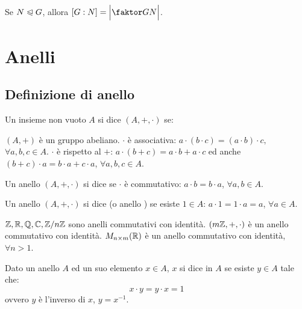 \documentclass[11pt]{scrartcl}
\begin{document}
\begin{remark}
Se $N \trianglelefteqslant G$, allora $[G:N]=\Big|\faktor GN\Big|$.
\end{remark}




\newpage
\section{Anelli}
\subsection{Definizione di anello}
\begin{definition}
Un insieme non vuoto $A$ si dice  $(A,+,\cdot)$ se:
	\begin{itemize}
	\ii $(A,+)$ è un gruppo abeliano.
	\ii  $\cdot$ è associativa: $a \cdot (b \cdot c)=(a \cdot b) \cdot c,$ $\forall a,b,c \in A$.
	\ii $\cdot$ è  rispetto al $+$: $a \cdot (b+c) = a \cdot b + a \cdot c$ ed anche $(b + c) \cdot a = b \cdot a + c \cdot a$, $\forall a,b,c \in A$.
	\end{itemize}
\end{definition}

\begin{definition}
Un anello $(A,+,\cdot)$ si dice  se $\cdot$ è commutativo: $a \cdot b = b \cdot a$, $\forall a,b \in A$.
\end{definition}

\begin{definition}
Un anello $(A,+,\cdot)$ si dice  (o anello ) se esiste $1 \in A$: $a \cdot 1 = 1 \cdot a = a$, $\forall a \in A$.
\end{definition}

\begin{example}
	\listhack
	\begin{itemize}
	\ii $\mathbb Z, \mathbb R, \mathbb Q, \mathbb C, {\mathbb Z}/n{\mathbb Z}$ sono anelli commutativi con identità.
	\ii $(m\mathbb Z,+,\cdot)$ è un anello commutativo con identità.
	\ii $M_{n \times m}(\mathbb R)$ è un anello commutativo con identità, $\forall n > 1$.
	\end{itemize}
\end{example}

\begin{definition}
Dato un anello $A$ ed un suo elemento $x \in A$, $x$ si dice  in $A$ se esiste $y \in A$ tale che:
	\[ x \cdot y = y \cdot x = 1
	\]
ovvero $y$ è l'inverso di $x$, $y=x^{-1}$.
\end{definition}
\end{document}
